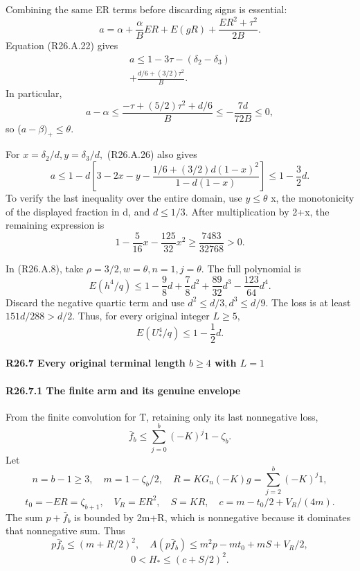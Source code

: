 Combining the same ER terms before discarding signs is essential:
\[
a=\alpha+\frac{\alpha}{B}ER+E(gR)
+\frac{ER^2+\tau^2}{2B}.
\]
Equation (R26.A.22) gives
\[
\begin{gathered}
a\le1-3\tau-(\delta_2-\delta_3)\\
+\frac{d/6+(3/2)\tau^2}{B}.
\end{gathered}\tag{R26.A.26}
\]
In particular,
\[
a-\alpha\le
\frac{-\tau+(5/2)\tau^2+d/6}{B}
\le-\frac{7d}{72B}\le0,
\]
so (\(a-\beta)_+\le \theta.\)

For \(x=\delta_2/d,\allowbreak  y=\delta_3/d,\allowbreak \) (R26.A.26) also gives
\[
a\le1-d\left[
3-2x-y-\frac{1/6+(3/2)d(1-x)^2}{1-d(1-x)}
\right]\le1-\frac32d.
\]
To verify the last inequality over the entire domain, use \(y\le \theta\) x,
the monotonicity of the displayed fraction in d, and \(d\le 1/3.\)
After multiplication by 2+x, the remaining expression is
\[
1-\frac5{16}x-\frac{125}{32}x^2
\ge\frac{7483}{32768}>0.
\]

In (R26.A.8), take \(\rho=3/2,\allowbreak  w=\theta,\allowbreak  n=1,\allowbreak  j=\theta.\) The full polynomial is
\[
E(h^4/q)\le
1-\frac98d+\frac78d^2+\frac{89}{32}d^3-\frac{123}{64}d^4.
\]
Discard the negative quartic term and use \(d^2\le d/3,\allowbreak  d^3\le d/9.\) The loss is
at least \(151d/288>d/2.\) Thus, for every original integer \(L\ge 5,\allowbreak \)
\[
E(U_*^4/q)\le1-\frac12d.
\]

\paragraph{R26.7 Every original terminal length \(b\ge 4\) with \(L=1\)}

\paragraph{R26.7.1 The finite arm and its genuine envelope}

From the finite convolution for T, retaining only its last nonnegative
loss,
\[
\bar f_b\le\sum_{j=0}^b(-K)^j1-\zeta_b.
\]
Let
\[
n=b-1\ge3,\quad m=1-\zeta_b/2,\quad
R=KG_n(-K)g=\sum_{j=2}^b(-K)^j1,
\]
\[
t_0=-ER=\zeta_{b+1},\quad V_R=ER^2,\quad S=KR,\quad
c=m-t_0/2+V_R/(4m).
\]
The sum \(p+\bar f_b\) is bounded by 2m+R, which is nonnegative because it
dominates that nonnegative sum. Thus
\[
p\bar f_b\le(m+R/2)^2,\quad
A(p\bar f_b)\le m^2p-mt_0+mS+V_R/2,
\]
\[
0<H_*\le(c+S/2)^2.                              \tag{R26.A.27}
\]

